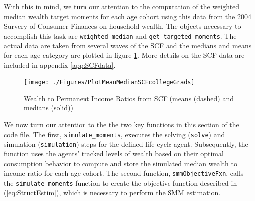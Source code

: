 \documentclass[titlepage, headings=optiontotocandhead]{\econtex}
\begin{document}

With this in mind, we turn our attention to the computation
of the weighted median wealth target moments for each age cohort
using this data from the 2004 Survery of Consumer Finances on household
wealth. The objects necessary to accomplish this task are \texttt{weighted\_median} and
\texttt{get\_targeted\_moments}. The actual data are taken from several waves of the SCF and the medians
and means for each age category are plotted in figure \ref{fig:MeanMedianSCF}.
More details on the SCF data are included in appendix \ref{app:SCFdata}.

\hypertarget{PlotMeanMedianSCFcollegeGrads}{}
\begin{figure}
  \texttt{[image: ./Figures/PlotMeanMedianSCFcollegeGrads]}
  \caption{Wealth to Permanent Income Ratios from SCF (means (dashed) and medians (solid))}
  \label{fig:MeanMedianSCF}
\end{figure}

We now turn our attention to the the two key functions in this
section of the code file. The first, \texttt{simulate\_moments}, executes the solving (\texttt{solve})
and simulation (\texttt{simulation}) steps for the defined life-cycle agent.
Subsequently, the function uses the agents' tracked levels of wealth based on
their optimal consumption behavior to compute and store the simulated median
wealth to income ratio for each age cohort. The second function, \texttt{smmObjectiveFxn},
calls the \texttt{simulate\_moments} function to create the objective function
described in (\ref{eq:StructEstim}), which is necessary to perform the SMM estimation.


\end{document}
